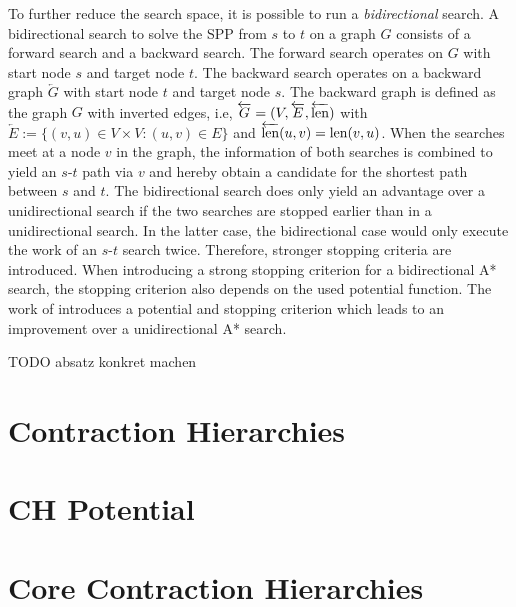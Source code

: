 To further reduce the search space, it is possible to run a \emph{bidirectional} search. A bidirectional search to solve the SPP from $s$ to $t$ on a graph $G$ consists of a forward search and a backward search. The forward search operates on $G$ with start node $s$ and target node $t$. The backward search operates on a backward graph $\overleftarrow{G}$ with start node $t$ and target node $s$. The backward graph is defined as the graph $G$ with inverted edges, i.e, $\overleftarrow{G} = (V,\overleftarrow{E},\overleftarrow{\operatorname{len}})$ with $\overleftarrow{E} := \{(v,u) \in V \times V : (u,v) \in E\}$ and $\overleftarrow{\operatorname{len}}(u,v) = \operatorname{len}(v,u)$. When the searches meet at a node $v$ in the graph, the information of both searches is combined to yield an $s$-$t$ path via $v$ and hereby obtain a candidate for the shortest path between $s$ and $t$. The bidirectional search does only yield an advantage over a unidirectional search if the two searches are stopped earlier than in a unidirectional search. In the latter case, the bidirectional case would only execute the work of an $s$-$t$ search twice. Therefore, stronger stopping criteria are introduced. When introducing a strong stopping criterion for a bidirectional A* search, the stopping criterion also depends on the used potential function. The work of \cite{goldberg:2005} introduces a potential and stopping criterion which leads to an improvement over a unidirectional A* search.

TODO absatz konkret machen

\section{Contraction Hierarchies}
\label{sec:ch}
\section{CH Potential\label{sec:ch_pot}}
\section{Core Contraction Hierarchies}